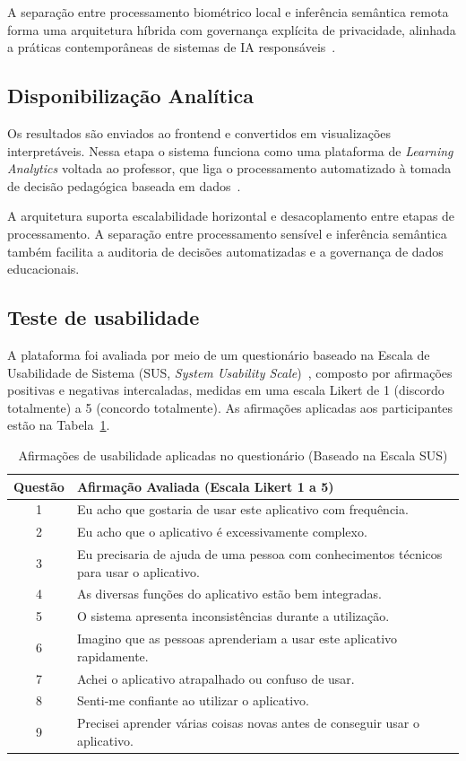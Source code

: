 \documentclass[12pt]{article}
\begin{document}
A separação entre processamento biométrico local e inferência semântica remota forma uma arquitetura híbrida com governança explícita de privacidade, alinhada a práticas contemporâneas de sistemas de IA responsáveis~\cite{kleppmann2017designing}.

\subsection{Disponibilização Analítica}

Os resultados são enviados ao frontend e convertidos em visualizações interpretáveis. Nessa etapa o sistema funciona como uma plataforma de \textit{Learning Analytics} voltada ao professor, que liga o processamento automatizado à tomada de decisão pedagógica baseada em dados~\cite{siemens2012learning}.

A arquitetura suporta escalabilidade horizontal e desacoplamento entre etapas de processamento. A separação entre processamento sensível e inferência semântica também facilita a auditoria de decisões automatizadas e a governança de dados educacionais.

\subsection{Teste de usabilidade}
A plataforma foi avaliada por meio de um questionário baseado na Escala de Usabilidade de Sistema (SUS, \textit{System Usability Scale})~\cite{brooke1996sus}, composto por afirmações positivas e negativas intercaladas, medidas em uma escala Likert de 1 (discordo totalmente) a 5 (concordo totalmente). As afirmações aplicadas aos participantes estão na Tabela~\ref{tab:perguntas_sus_aplicadas}.

\begin{table}[ht]
\centering
\footnotesize
\caption{Afirmações de usabilidade aplicadas no questionário (Baseado na Escala SUS)}
\label{tab:perguntas_sus_aplicadas}
\begin{tabular}{c p{12cm}}
\toprule
\textbf{Questão} & \textbf{Afirmação Avaliada (Escala Likert 1 a 5)} \\
\midrule
1 & Eu acho que gostaria de usar este aplicativo com frequência. \\
2 & Eu acho que o aplicativo é excessivamente complexo. \\
3 & Eu precisaria de ajuda de uma pessoa com conhecimentos técnicos para usar o aplicativo. \\
4 & As diversas funções do aplicativo estão bem integradas. \\
5 & O sistema apresenta inconsistências durante a utilização. \\
6 & Imagino que as pessoas aprenderiam a usar este aplicativo rapidamente. \\
7 & Achei o aplicativo atrapalhado ou confuso de usar. \\
8 & Senti-me confiante ao utilizar o aplicativo. \\
9 & Precisei aprender várias coisas novas antes de conseguir usar o aplicativo. \\
\bottomrule
\end{tabular}
\end{table}
\end{document}
